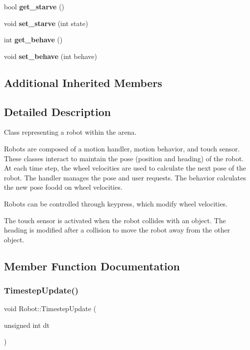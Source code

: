 \begin{DoxyCompactItemize}
bool {\bfseries get\+\_\+starve} ()
\item 
\mbox{\label{class_robot_a1ba37df1aea14444965ee0ec339a7f26}} 
void {\bfseries set\+\_\+starve} (int state)
\item 
\mbox{\label{class_robot_ae4e7f627e35542a5ebc3a50e784160d2}} 
int {\bfseries get\+\_\+behave} ()
\item 
\mbox{\label{class_robot_ab7d255b72a993d112c3da120b898ce4a}} 
void {\bfseries set\+\_\+behave} (int behave)
\end{DoxyCompactItemize}
\subsection*{Additional Inherited Members}


\subsection{Detailed Description}
Class representing a robot within the arena. 

Robots are composed of a motion handler, motion behavior, and touch sensor. These classes interact to maintain the pose (position and heading) of the robot. At each time step, the wheel velocities are used to calculate the next pose of the robot. The handler manages the pose and user requests. The behavior calculates the new pose foodd on wheel velocities.

Robots can be controlled through keypress, which modify wheel velocities.

The touch sensor is activated when the robot collides with an object. The heading is modified after a collision to move the robot away from the other object. 

\subsection{Member Function Documentation}
\mbox{\label{class_robot_ae790462f8782efcfd26082eedec30ed5}} 
\subsubsection{\texorpdfstring{Timestep\+Update()}{TimestepUpdate()}}
{\footnotesize\ttfamily void Robot\+::\+Timestep\+Update (\begin{DoxyParamCaption}\item[{unsigned int}]{dt }\end{DoxyParamCaption})\hspace{0.3cm}{\ttfamily [override]}}



